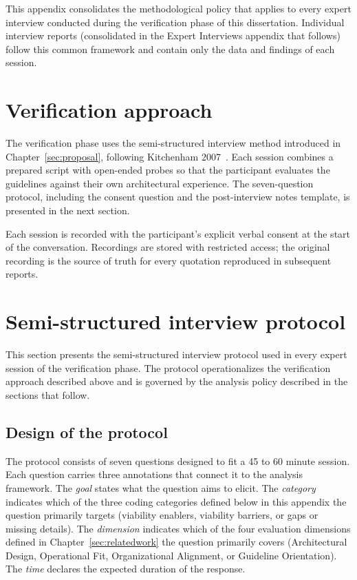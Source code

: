 
This appendix consolidates the methodological policy that applies to every expert interview conducted during the verification phase of this dissertation. Individual interview reports (consolidated in the Expert Interviews appendix that follows) follow this common framework and contain only the data and findings of each session.

\section*{Verification approach}

The verification phase uses the semi-structured interview method introduced in Chapter~\ref{sec:proposal}, following Kitchenham 2007~\cite{kitchenham2007guidelines}. Each session combines a prepared script with open-ended probes so that the participant evaluates the guidelines against their own architectural experience. The seven-question protocol, including the consent question and the post-interview notes template, is presented in the next section.

Each session is recorded with the participant's explicit verbal consent at the start of the conversation. Recordings are stored with restricted access; the original recording is the source of truth for every quotation reproduced in subsequent reports.

\section*{Semi-structured interview protocol}
\label{ape:protocol}

This section presents the semi-structured interview protocol used in every expert session of the verification phase. The protocol operationalizes the verification approach described above and is governed by the analysis policy described in the sections that follow.

\subsection*{Design of the protocol}

The protocol consists of seven questions designed to fit a 45 to 60 minute session. Each question carries three annotations that connect it to the analysis framework. The \emph{goal} states what the question aims to elicit. The \emph{category} indicates which of the three coding categories defined below in this appendix the question primarily targets (viability enablers, viability barriers, or gaps or missing details). The \emph{dimension} indicates which of the four evaluation dimensions defined in Chapter~\ref{sec:relatedwork} the question primarily covers (Architectural Design, Operational Fit, Organizational Alignment, or Guideline Orientation). The \emph{time} declares the expected duration of the response.

